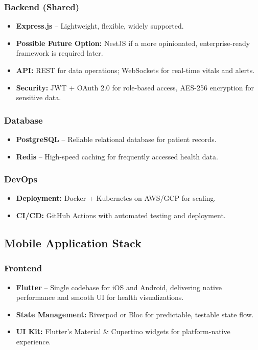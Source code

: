 \documentclass[a4paper, 12pt]{article}
\begin{document}
\subsubsection*{Backend (Shared)}
\begin{itemize}
    \item \textbf{Express.js} – Lightweight, flexible, widely supported.
    \item \textbf{Possible Future Option:} NestJS if a more opinionated, enterprise-ready framework is required later.
    \item \textbf{API:} REST for data operations; WebSockets for real-time vitals and alerts.
    \item \textbf{Security:} JWT + OAuth 2.0 for role-based access, AES-256 encryption for sensitive data.
\end{itemize}

\subsubsection*{Database}
\begin{itemize}
    \item \textbf{PostgreSQL} – Reliable relational database for patient records.
    \item \textbf{Redis} – High-speed caching for frequently accessed health data.
\end{itemize}

\subsubsection*{DevOps}
\begin{itemize}
    \item \textbf{Deployment:} Docker + Kubernetes on AWS/GCP for scaling.
    \item \textbf{CI/CD:} GitHub Actions with automated testing and deployment.
\end{itemize}

\subsection{Mobile Application Stack}
\subsubsection*{Frontend}
\begin{itemize}
    \item \textbf{Flutter} – Single codebase for iOS and Android, delivering native performance and smooth UI for health visualizations.
    \item \textbf{State Management:} Riverpod or Bloc for predictable, testable state flow.
    \item \textbf{UI Kit:} Flutter’s Material \& Cupertino widgets for platform-native experience.
\end{itemize}
\end{document}
